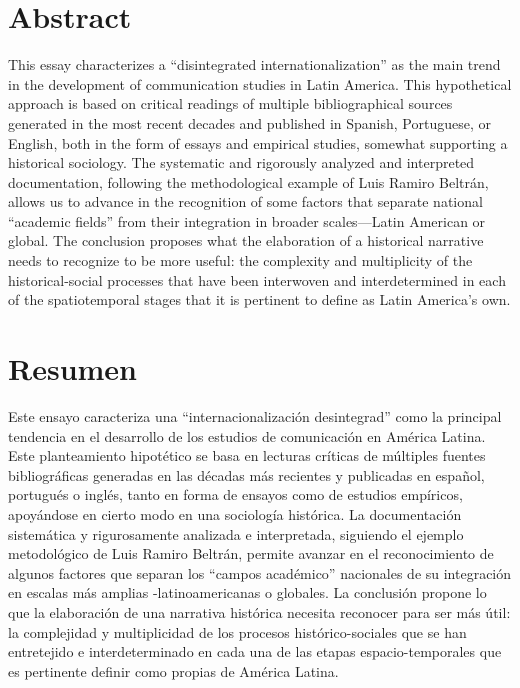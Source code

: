 \documentclass{tufte-handout}
\begin{document}
\begin{titlepage}
\begin{fullwidth}
\end{fullwidth}

\vspace*{5em}


\hypertarget{abstract}{%
\section{Abstract}\label{abstract}}

This essay characterizes a ``disintegrated internationalization'' as the
main trend in the development of communication studies in Latin America.
This hypothetical approach is based on critical readings of multiple
bibliographical sources generated in the most recent decades and
published in Spanish, Portuguese, or English, both in the form of essays
and empirical studies, somewhat supporting a historical sociology. The
systematic and rigorously analyzed and interpreted documentation,
following the methodological example of Luis Ramiro Beltrán, allows us
to advance in the recognition of some factors that separate national
``academic fields'' from their integration in broader scales---Latin
American or global. The conclusion proposes what the elaboration of a
historical narrative needs to recognize to be more useful: the
complexity and multiplicity of the historical-social processes that have
been interwoven and interdetermined in each of the spatiotemporal stages
that it is pertinent to define as Latin America's own.


\hypertarget{abstract}{%
\section{Resumen}\label{resumen}}

Este ensayo caracteriza una ``internacionalización desintegrad'' como la principal tendencia en el desarrollo de los estudios de comunicación en América Latina. Este planteamiento hipotético se basa en lecturas críticas de múltiples fuentes bibliográficas generadas en las décadas más recientes y publicadas en español, portugués o inglés, tanto en forma de ensayos como de estudios empíricos, apoyándose en cierto modo en una sociología histórica. La documentación sistemática y rigurosamente analizada e interpretada, siguiendo el ejemplo metodológico de Luis Ramiro Beltrán, permite avanzar en el reconocimiento de algunos factores que separan los ``campos académico'' nacionales de su integración en escalas más amplias -latinoamericanas o globales. La conclusión propone lo que la elaboración de una narrativa histórica necesita reconocer para ser más útil: la complejidad y multiplicidad de los procesos histórico-sociales que se han entretejido e interdeterminado en cada una de las etapas espacio-temporales que es pertinente definir como propias de América Latina.


 




 \end{titlepage}
\end{document}
